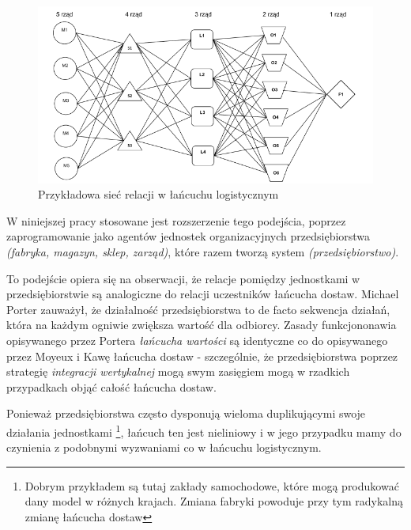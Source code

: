 \documentclass{article}
\begin{document}
\begin{figure}
  \centering
\includegraphics[width=\linewidth]{pictures/siec.png}
  \caption{Przykładowa sieć relacji w łańcuchu logistycznym}
  \label{fig:siecKawa}

\end{figure}

W niniejszej pracy stosowane jest rozszerzenie tego podejścia, poprzez zaprogramowanie jako agentów jednostek organizacyjnych przedsiębiorstwa \textit{(fabryka, magazyn, sklep, zarząd)}, które razem tworzą system \textit{(przedsiębiorstwo)}. 

To podejście opiera się na obserwacji, że relacje pomiędzy jednostkami w przedsiębiorstwie są analogiczne do relacji uczestników łańcucha dostaw. Michael Porter zauważył, że działalność przedsiębiorstwa to de facto sekwencja działań, która na każdym ogniwie zwiększa wartość dla odbiorcy. Zasady funkcjononawia opisywanego przez Portera \textit{łańcucha wartości} są identyczne co do opisywanego przez Moyeux i Kawę łańcucha dostaw - szczególnie, że przedsiębiorstwa poprzez strategię \textit{integracji wertykalnej} mogą swym zasięgiem mogą w rzadkich przypadkach objąć całość łańcucha dostaw.  

Ponieważ przedsiębiorstwa często dysponują wieloma duplikującymi swoje działania jednostkami \footnote{Dobrym przykładem są tutaj zakłady samochodowe, które mogą produkować dany model w różnych krajach. Zmiana fabryki powoduje przy tym radykalną zmianę łańcucha dostaw}, łańcuch ten jest nieliniowy i w jego przypadku mamy do czynienia z podobnymi wyzwaniami co w łańcuchu logistycznym.
\end{document}
